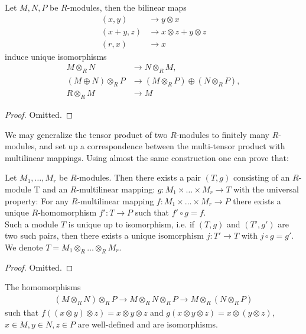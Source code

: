 \begin{lemma}
\label{lemma-flip-tensor-product}
Let $M, N, P$ be $R$-modules, then the bilinear maps \\
\begin{align}
(x, y) &\rightarrow y\otimes x\\
(x + y, z) &\rightarrow x\otimes z + y\otimes z\\
(r, x) &\rightarrow x
\end{align}
induce unique isomorphisms
\begin{align}
M\otimes_R N &\rightarrow N\otimes_R M, \\
(M\oplus N)\otimes_R P &\rightarrow (M\otimes_R P)\oplus(N\otimes_R P),  \\
R\otimes_R M &\rightarrow M
\end{align}
\end{lemma}

\begin{proof}
Omitted.
\end{proof}

\noindent
We may generalize the tensor product of two $R$-modules to finitely many
$R$-modules, and set up a
correspondence between the multi-tensor product with multilinear mappings.
Using almost the same construction
one can prove that:

\begin{lemma}
\label{lemma-multilinear}
Let $M_1, \ldots, M_r$ be $R$-modules.
Then there exists a pair $(T, g)$ consisting
of an $R$-module T and an
$R$-multilinear mapping:
$g : M_1\times \ldots\times M_r\rightarrow T$ with the universal
property: For any $R$-multilinear
mapping $f : M_1\times \ldots \times M_r\rightarrow P$ there exists a unique
$R$-homomorphism $f' : T\rightarrow P$ such that
$f'\circ g = f$. \\
Such a module $T$ is unique up to isomorphism, i.e. if $(T, g)$ and $(T', g')$
are two such pairs, then there exists a unique isomorphism
$j : T'\rightarrow T$ with $j\circ g = g'$. We denote
$T = M_1\otimes_R \ldots \otimes_R M_r$.
\end{lemma}

\begin{proof}
Omitted.
\end{proof}

\begin{lemma}
\label{lemma-transitive}
The homomorphisms
\begin{align}
(M\otimes_R N)\otimes_R P\rightarrow
M\otimes_R N\otimes_R P\rightarrow
M\otimes_R (N\otimes_R P)
\end{align}
such that
$f((x\otimes y)\otimes z) = x\otimes y\otimes z$
and $g(x\otimes y\otimes z) = x\otimes (y\otimes z)$,
$x\in M, y\in N, z\in P$ are well-defined and are isomorphisms.
\end{lemma}

